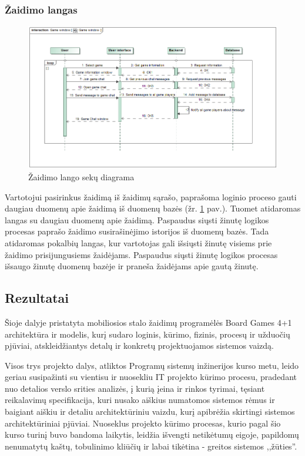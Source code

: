 \documentclass{VUMIFPSkursinis}
\begin{document}
	\subsubsection{Žaidimo langas}		
			\begin{figure}[H]
				\centering
				\includegraphics[scale=0.5]{img/GameWindow_sequence}
				\caption{Žaidimo lango sekų diagrama}
				\label{img:GameWindow_sequence}
			\end{figure}
			Vartotojui pasirinkus žaidimą iš žaidimų sąrašo, paprašoma loginio proceso
			gauti daugiau duomenų apie žaidimą iš duomenų bazės (žr. \ref{img:GameWindow_sequence} pav.). Tuomet atidaromas 
			langas su daugiau duomenų apie žaidimą. Paspaudus siųsti žinutę logikos 
			procesas paprašo žaidimo susirašinėjimo istorijos iš duomenų bazės. Tada
			atidaromas pokalbių langas, kur vartotojas gali išsiųsti žinutę visiems 
			prie žaidimo prisijungusiems žaidėjams. Paspaudus siųsti žinutę logikos 
			procesas išsaugo žinutę duomenų bazėje ir praneša žaidėjams apie gautą žinutę.
			
\subsection{Rezultatai}
Šioje dalyje pristatyta mobiliosios stalo žaidimų programėlės Board Games 4+1 architektūra ir
modelis, kurį sudaro loginis, kūrimo, fizinis, procesų ir užduočių pjūviai, atskleidžiantys detalų
ir konkretų projektuojamos sistemos vaizdą.

Visos trys projekto dalys, atliktos Programų sistemų inžinerijos kurso metu, leido geriau susipažinti
su vientisu ir nuosekliu IT projekto kūrimo procesu, pradedant nuo detalios verslo srities analizės,
į kurią įeina ir rinkos tyrimai, tęsiant reikalavimų specifikacija, kuri nusako aiškius numatomos
sistemos rėmus ir baigiant aiškiu ir detaliu architektūriniu vaizdu, kurį apibrėžia skirtingi sistemos
architektūriniai pjūviai. Nuoseklus projekto kūrimo procesas, kurio pagal šio kurso turinį buvo bandoma
laikytis, leidžia išvengti netikėtumų eigoje, papildomų nenumatytų kaštų, tobulinimo kliūčių ir labai
tikėtina - greitos sistemos ,,žūties''.
	
\end{document}
